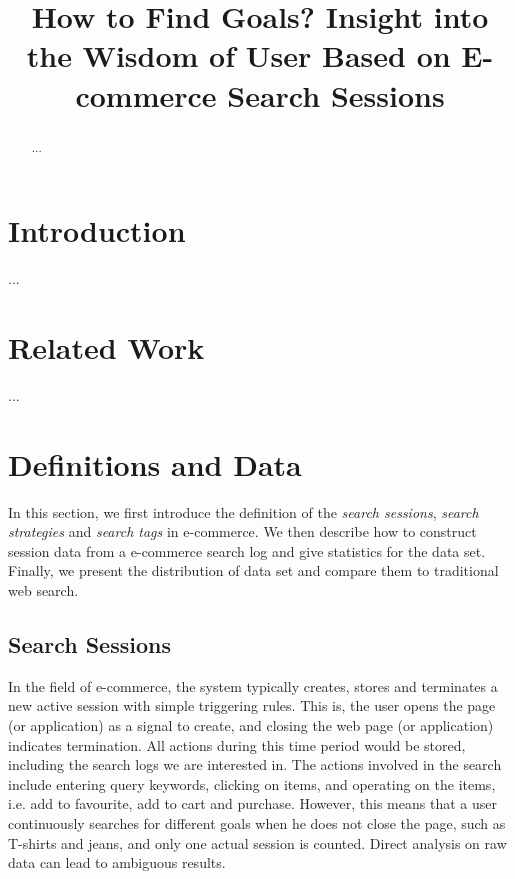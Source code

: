 \documentclass[sigconf,anonymous]{acmart}
\theoremstyle{definition}
\begin{document}
\title{How to Find Goals? Insight into the Wisdom of User Based on E-commerce Search Sessions}

\begin{abstract}
...


\end{abstract}



\maketitle
\section{Introduction}\label{sec:introduction}
...


\section{Related Work}\label{sec:related}
...

\section{Definitions and Data}\label{sec:definition}
In this section, we first introduce the definition of the \emph{search sessions}, \emph{search strategies} and \emph{search tags} in e-commerce. We then describe how to construct session data from a e-commerce search log and give statistics for the data set. Finally, we present the distribution of data set and compare them to traditional web search.

\subsection{Search Sessions}\label{sec:definition:session}
In the field of e-commerce, the system typically creates, stores and terminates a new active session with simple triggering rules. This is, the user opens the page (or application) as a signal to create, and closing the web page (or application) indicates termination. All actions during this time period would be stored, including the search logs we are interested in. The actions involved in the search include entering query keywords, clicking on items, and operating on the items, i.e. add to favourite, add to cart and purchase. However, this means that a user continuously searches for different goals when he does not close the page, such as T-shirts and jeans, and only one actual session is counted. Direct analysis on raw data can lead to ambiguous results. 
\end{document}
